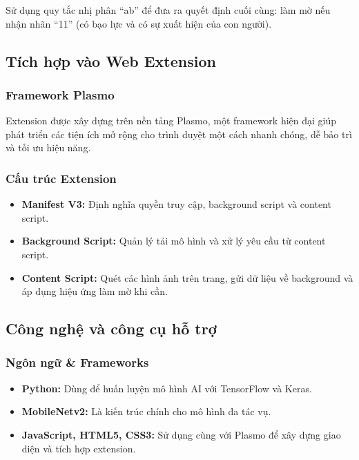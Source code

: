 \documentclass[12pt,a4paper]{article}
\begin{document}
Sử dụng quy tắc nhị phân ``ab'' để đưa ra quyết định cuối cùng: làm mờ nếu nhận nhãn ``11'' (có bạo lực và có sự xuất hiện của con người).

\subsection{Tích hợp vào Web Extension}

\subsubsection{Framework Plasmo}

Extension được xây dựng trên nền tảng Plasmo, một framework hiện đại giúp phát triển các tiện ích mở rộng cho trình duyệt một cách nhanh chóng, dễ bảo trì và tối ưu hiệu năng.

\subsubsection{Cấu trúc Extension}

\begin{itemize}
  \item \textbf{Manifest V3:} Định nghĩa quyền truy cập, background script và content script.
  
  \item \textbf{Background Script:} Quản lý tải mô hình và xử lý yêu cầu từ content script.
  
  \item \textbf{Content Script:} Quét các hình ảnh trên trang, gửi dữ liệu về background và áp dụng hiệu ứng làm mờ khi cần.
\end{itemize}

\subsection{Công nghệ và công cụ hỗ trợ}

\subsubsection{Ngôn ngữ \& Frameworks}

\begin{itemize}
  \item \textbf{Python:} Dùng để huấn luyện mô hình AI với TensorFlow và Keras.
  
  \item \textbf{MobileNetv2:} Là kiến trúc chính cho mô hình đa tác vụ.
  
  \item \textbf{JavaScript, HTML5, CSS3:} Sử dụng cùng với Plasmo để xây dựng giao diện và tích hợp extension.
\end{itemize}
\end{document}
